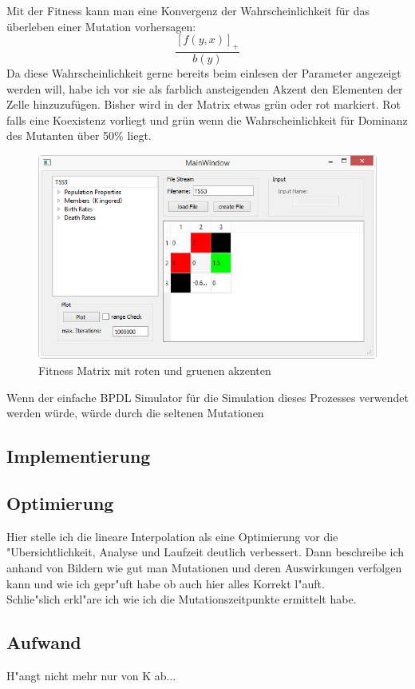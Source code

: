 \documentclass[11pt, a4paper, german]{article}
\theoremstyle{plain}
\begin{document}
Mit der Fitness kann man eine Konvergenz der Wahrscheinlichkeit für das überleben einer Mutation vorhersagen:
\[ \frac{\left[ f(y,x)\right]_+ }{b(y)} \]
Da diese Wahrscheinlichkeit gerne bereits beim einlesen der Parameter angezeigt werden will, habe ich vor sie als farblich ansteigenden Akzent den Elementen der Zelle hinzuzufügen. Bisher wird in der Matrix etwas grün oder rot markiert. Rot falls eine Koexistenz vorliegt und grün wenn die Wahrscheinlichkeit für Dominanz des Mutanten über 50\% liegt.
\begin{figure}[H]
	\centering
	\includegraphics[width=0.7\linewidth]{./Pictures/MainWindow_red_green_loaded}
	\caption[MainWindow_redGreenFitness]{Fitness Matrix mit roten und gruenen akzenten}
	\label{fig:MainWindow_red_green_loaded}
\end{figure}
Wenn der einfache BPDL Simulator für die Simulation dieses Prozesses verwendet werden würde, würde durch die seltenen Mutationen

	\subsection{Implementierung}
	
	\subsection{Optimierung}
	Hier stelle ich die lineare Interpolation als eine Optimierung vor die "Ubersichtlichkeit, Analyse und Laufzeit deutlich verbessert. Dann beschreibe ich anhand von Bildern wie gut man Mutationen und deren Auswirkungen verfolgen kann und wie ich gepr"uft habe ob auch hier alles Korrekt l"auft.\\
	Schlie"slich erkl"are ich wie ich die Mutationszeitpunkte ermittelt habe.
	
	\subsection{Aufwand}
	H"angt nicht mehr nur von K ab...
	
\end{document}
